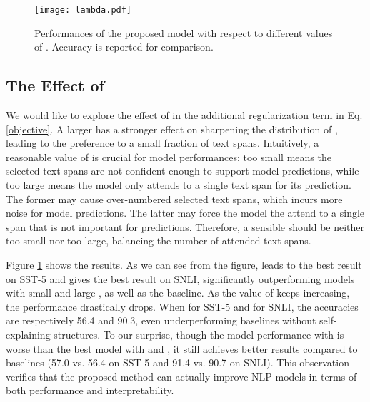 \documentclass[11pt,a4paper]{article}
\begin{document}
\begin{figure}
  \centering
  \texttt{[image: lambda.pdf]}
  \caption{Performances of the proposed model with respect to different values of . Accuracy is reported for comparison.}
  \label{fig:lambda}
\end{figure}


\subsection{The Effect of }
We would like to explore the effect of  in the additional regularization term in Eq.\ref{objective}. A larger  has a stronger effect on sharpening the distribution of , leading to the preference to a small fraction of text spans. Intuitively, a reasonable value of  is crucial for model performances: too small   means the selected text spans are not confident enough to support model predictions, while too large  means the model only attends to a single text span for its prediction. The former may cause  over-numbered selected text spans, which incurs more noise for model predictions. The latter may force the model the attend to a single span that is not important for predictions. Therefore, a sensible  should be neither too small nor too large, balancing the number of attended text spans.

Figure \ref{fig:lambda} shows the results. As we can see from the figure,  leads to the best result on SST-5 and  gives the best result on SNLI, significantly outperforming models with small  and large , as well as the baseline. As the value of  keeps increasing, the performance drastically drops. When  for SST-5 and  for SNLI, the accuracies are respectively 56.4 and 90.3, even underperforming baselines without self-explaining structures. 
To our surprise, though the model performance with  is worse than the best model with  and , it still achieves better results compared to baselines (57.0 vs. 56.4 on SST-5 and 91.4 vs. 90.7 on SNLI). This observation verifies that the proposed method can actually improve NLP models in terms of both performance and interpretability.
\end{document}
